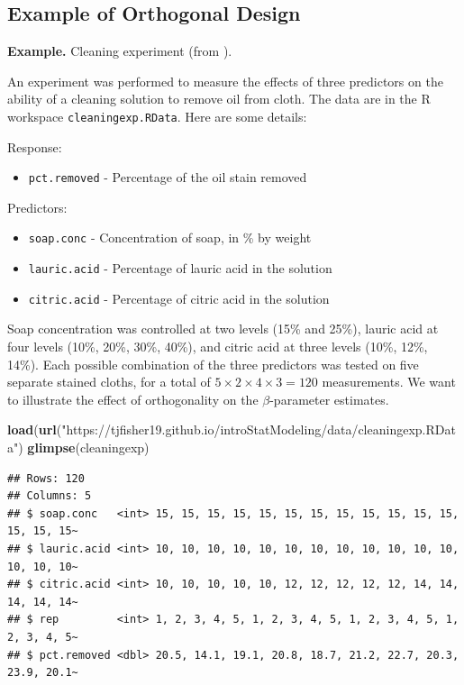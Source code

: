 \documentclass[
]{book}
\newenvironment{Shaded}{\begin{snugshade}}{\end{snugshade}}
\newcommand{\FunctionTok}[1]{\textcolor[rgb]{0.13,0.29,0.53}{\textbf{#1}}}
\newcommand{\NormalTok}[1]{#1}
\newcommand{\StringTok}[1]{\textcolor[rgb]{0.31,0.60,0.02}{#1}}
\providecommand{\tightlist}{%
  \setlength{\itemsep}{0pt}\setlength{\parskip}{0pt}}
\begin{document}
\hypertarget{example-of-orthogonal-design}{%
\subsection{Example of Orthogonal Design}\label{example-of-orthogonal-design}}

\textbf{Example.} Cleaning experiment (from \citet{NavidiMonk2015}).

An experiment was performed to measure the effects of three predictors on the ability of a cleaning solution to remove oil from cloth. The data are in the R workspace \texttt{cleaningexp.RData}. Here are some details:

Response:

\begin{itemize}
\tightlist
\item
  \texttt{pct.removed} - Percentage of the oil stain removed
\end{itemize}

Predictors:

\begin{itemize}
\tightlist
\item
  \texttt{soap.conc} - Concentration of soap, in \% by weight
\item
  \texttt{lauric.acid} - Percentage of lauric acid in the solution
\item
  \texttt{citric.acid} - Percentage of citric acid in the solution
\end{itemize}

Soap concentration was controlled at two levels (15\% and 25\%), lauric acid at four levels (10\%, 20\%, 30\%, 40\%), and citric acid at three levels (10\%, 12\%, 14\%).
Each possible combination of the three predictors was tested on five separate stained cloths, for a total of \(5 \times 2 \times 4 \times 3 = 120\) measurements.
We want to illustrate the effect of orthogonality on the \(\beta\)-parameter estimates.

\begin{Shaded}
\begin{Highlighting}[]
\FunctionTok{load}\NormalTok{(}\FunctionTok{url}\NormalTok{(}\StringTok{"https://tjfisher19.github.io/introStatModeling/data/cleaningexp.RData"}\NormalTok{)}
\FunctionTok{glimpse}\NormalTok{(cleaningexp)}
\end{Highlighting}
\end{Shaded}

\begin{verbatim}
## Rows: 120
## Columns: 5
## $ soap.conc   <int> 15, 15, 15, 15, 15, 15, 15, 15, 15, 15, 15, 15, 15, 15, 15~
## $ lauric.acid <int> 10, 10, 10, 10, 10, 10, 10, 10, 10, 10, 10, 10, 10, 10, 10~
## $ citric.acid <int> 10, 10, 10, 10, 10, 12, 12, 12, 12, 12, 14, 14, 14, 14, 14~
## $ rep         <int> 1, 2, 3, 4, 5, 1, 2, 3, 4, 5, 1, 2, 3, 4, 5, 1, 2, 3, 4, 5~
## $ pct.removed <dbl> 20.5, 14.1, 19.1, 20.8, 18.7, 21.2, 22.7, 20.3, 23.9, 20.1~
\end{verbatim}
\end{document}
